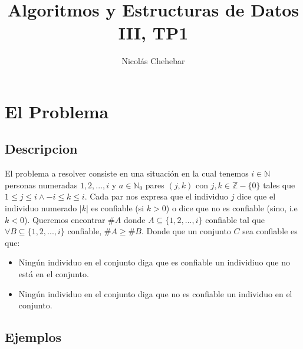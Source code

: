 \documentclass[A4paper,oneside,fleqn,10pt]{article}
\title{Algoritmos y Estructuras de Datos III, TP1}
\author{Nicolás Chehebar}
\date{}
\theoremstyle{definition}
\newcommand{\ZZ}{\mathbb{Z}}      %
\newcommand{\NN}{\mathbb{N}}
\begin{document}
\maketitle
\tableofcontents
\clearpage

\section{El Problema}

\subsection{Descripcion}

El problema a resolver consiste en una situación en la cual tenemos  $i\in \NN$ personas numeradas $1,2,...,i$ y $a\in \NN_{0}$ pares $(j,k)$ con $j,k \in \ZZ - \{ 0 \}$ tales que $1\leq j\leq i \land -i \leq k \leq i$. Cada par nos expresa que el individuo $j$ dice que el individuo numerado $|k|$ es confiable (si $k>0$) o dice que no es confiable (sino, i.e $k<0$). Queremos encontrar $\#A$ donde $A \subseteq \{1,2,...,i \}$ confiable tal que $ \forall B \subseteq \{1,2,...,i\}$ confiable, $\#A \geq \#B$. 
Donde que un conjunto $C$ sea confiable es que: 
\begin{itemize}

\item Ningún individuo en el conjunto diga que es confiable un individiuo que no está en el conjunto.

\item Ningún individuo en el conjunto diga que no es confiable un individuo en el conjunto.

\end{itemize}


\subsection{Ejemplos}
\end{document}
